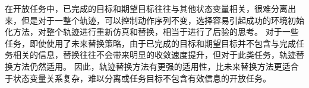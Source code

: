         在开放任务中，已完成的目标和期望目标往往与其他状态变量相关，很难分离出来，但是对于一整个轨迹，可以控制动作序列不变，选择容易引起成功的环境初始化方法，对整个轨迹进行重新仿真和替换，相当于进行了后验的思考。
        对于一些任务，即使使用了未来替换策略，由于已完成的目标和期望目标并不包含与完成任务相关的信息，替换往往不会带来明显的收敛速度提升，但对于此类任务，轨迹替换方法仍然适用。
        因此，轨迹替换方法有更强的适用性，比未来替换方法更适合于状态变量关系复杂，难以分离或任务目标不包含有效信息的开放任务。
